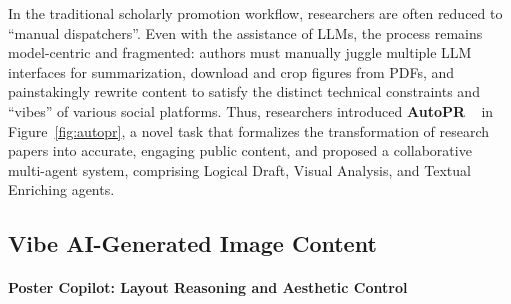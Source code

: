 \documentclass{article}
\begin{document}
In the traditional scholarly promotion workflow, researchers are often reduced to ``manual dispatchers''. Even with the assistance of LLMs, the process remains model-centric and fragmented: authors must manually juggle multiple LLM interfaces for summarization, download and crop figures from PDFs, and painstakingly rewrite content to satisfy the distinct technical constraints and ``vibes'' of various social platforms. 
Thus, researchers introduced \textbf{AutoPR} ~\citep{chen2025autoprletsautomateacademic} in Figure~\ref{fig:autopr}, a novel task that formalizes the transformation of research papers into accurate, engaging public content, and proposed a collaborative multi-agent system, comprising Logical Draft, Visual Analysis, and Textual Enriching agents.

\subsection{Vibe AI-Generated Image Content}


\paragraph{Poster Copilot: Layout Reasoning and Aesthetic Control} 
\end{document}
